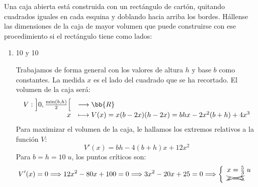 \begin{ejercicio}
    Una caja abierta está construida con un rectángulo de cartón, quitando cuadrados iguales en cada esquina y doblando hacia arriba los bordes. Hállense las dimensiones de la caja de mayor volumen que puede construirse con ese procedimiento si el rectángulo tiene como lados:
    \begin{enumerate}
        \item 10 y 10
        \begin{figure}[H]
            \centering
        \end{figure}
        Trabajamos de forma general con los valores de altura $h$ y base $b$ como constantes. La medida $x$ es el lado del cuadrado que se ha recortado. El volumen de la caja será:
        \begin{equation*}
            \begin{array}{rl}
                V:\left]0, \frac{\min(b,h)}{2}\right[ & \longrightarrow \bb{R}\\
                        x & \longmapsto V(x) = x(b-2x)(h-2x) = bhx-2x^2(b+h)+4x^3
            \end{array}
        \end{equation*}
        Para maximizar el volumen de la caja, le hallamos los extremos relativos a la función $V$:
        \begin{equation*}
            V'(x)=bh - 4(b+h)x + 12x^2
        \end{equation*}
        Para $b=h=10\;u$, los puntos críticos son:
        \begin{equation*}
            V'(x)=0\Longrightarrow 12x^2 - 80x + 100 = 0 \Longrightarrow 3x^2 - 20x + 25=0\Longrightarrow  \left\{\begin{array}{l}
                x = \frac{5}{3}\;u \\
                \xcancel{x=5}
            \end{array}\right.
        \end{equation*}


\end{enumerate}
\end{ejercicio}
